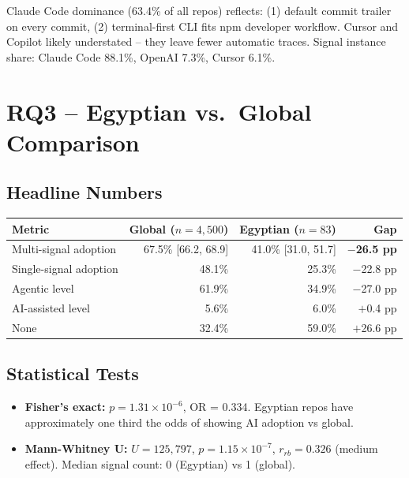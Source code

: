 \documentclass[12pt,a4paper]{article}
\begin{document}
Claude Code dominance (63.4\% of all repos) reflects: (1) default commit trailer on every commit, (2) terminal-first CLI fits npm developer workflow. Cursor and Copilot likely understated -- they leave fewer automatic traces. Signal instance share: Claude Code 88.1\%, OpenAI 7.3\%, Cursor 6.1\%.

\section{RQ3 -- Egyptian vs.\ Global Comparison}

\subsection{Headline Numbers}

\begin{table}[h]
\centering
\begin{tabular}{@{}lrrr@{}}
\toprule
Metric & Global ($n=4{,}500$) & Egyptian ($n=83$) & Gap \\
\midrule
Multi-signal adoption & 67.5\% [66.2, 68.9] & 41.0\% [31.0, 51.7] & \textbf{$-$26.5 pp} \\
Single-signal adoption & 48.1\%              & 25.3\%               & $-$22.8 pp \\
Agentic level          & 61.9\%              & 34.9\%               & $-$27.0 pp \\
AI-assisted level      &  5.6\%              &  6.0\%               & $+$0.4 pp \\
None                   & 32.4\%              & 59.0\%               & $+$26.6 pp \\
\bottomrule
\end{tabular}
\end{table}

\subsection{Statistical Tests}

\begin{itemize}
  \item \textbf{Fisher's exact:} $p = 1.31 \times 10^{-6}$, OR = 0.334. Egyptian repos have approximately one third the odds of showing AI adoption vs global.
  \item \textbf{Mann-Whitney U:} $U = 125{,}797$, $p = 1.15 \times 10^{-7}$, $r_{rb} = 0.326$ (medium effect). Median signal count: 0 (Egyptian) vs 1 (global).
\end{itemize}
\end{document}
